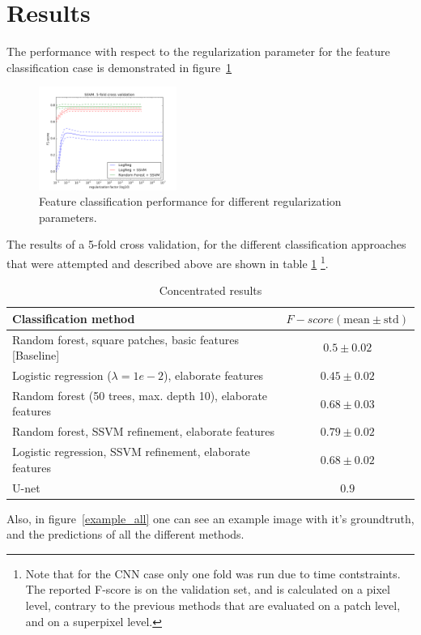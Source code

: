 \documentclass[10pt,conference,compsocconf]{IEEEtran}
\begin{document}
	\section{Results}
	The performance with respect to the regularization parameter for the feature classification case is demonstrated in figure~\ref{fig:reg_ssvm}
		\begin{figure}[!h]
			\centering
			\includegraphics[width=0.4\textwidth]{cross_val_ssvm.png}
			\caption{Feature classification performance for different regularization parameters.}
			\label{fig:reg_ssvm}
		\end{figure}
The results of a 5-fold cross validation, for the different classification
  approaches that were attempted and described above are shown in table \ref{table:results}  \footnote{Note that for the CNN case only one fold was run due to time contstraints. The reported F-score is on the validation set, and is calculated on a pixel level, contrary to the previous methods that are evaluated on a patch level, and on a superpixel level.}.
		\begin{table}[h]
			\begin{tabular}{p{} c}		
				\textbf{Classification method} &  \textbf{$F-score (\text{mean}\pm \text{std})$}\\
				\hline \hline
				Random forest, square patches, basic features [Baseline] & $0.5 \pm 0.02$ \\ \hline
				Logistic regression ($\lambda = 1e-2$), elaborate features& $0.45 \pm 0.02$ \\ \hline
				Random forest (50 trees, max. depth 10), elaborate features& $0.68 \pm 0.03$ \\ \hline
				Random forest, SSVM refinement, elaborate features & $0.79 \pm 0.02$ \\ \hline
				Logistic regression, SSVM refinement, elaborate features& $0.68 \pm 0.02$ \\ \hline
				U-net & $0.9$ \\
				\hline
			\end{tabular}
			\caption{\label{table:results}Concentrated results}
		\end{table}
	Also, in figure~\ref{example_all} one can see an example image with it's groundtruth, and the predictions of all the different methods.
\end{document}
